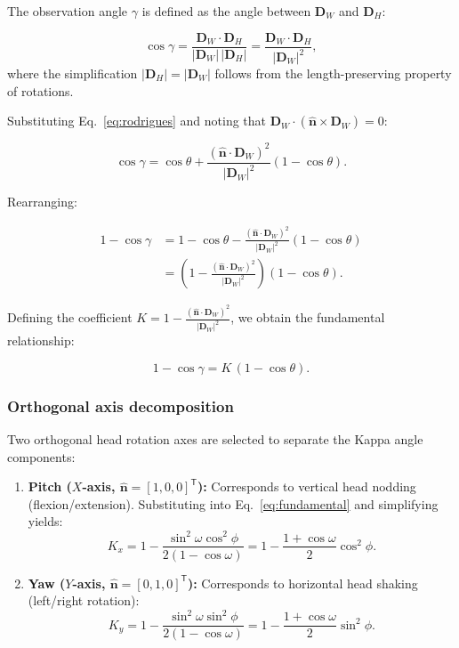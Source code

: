 \documentclass[review,numbers,sort&compress]{elsarticle}
\begin{document}
The observation angle $\gamma$ is defined as the angle between $\mathbf{D}_W$ and $\mathbf{D}_H$:

\begin{equation}
\cos\gamma = \frac{\mathbf{D}_W\cdot\mathbf{D}_H}{|\mathbf{D}_W|\,|\mathbf{D}_H|} = \frac{\mathbf{D}_W\cdot\mathbf{D}_H}{|\mathbf{D}_W|^2},
\end{equation}
where the simplification $|\mathbf{D}_H| = |\mathbf{D}_W|$ follows from the length-preserving property of rotations.

Substituting Eq.~\ref{eq:rodrigues} and noting that $\mathbf{D}_W\cdot(\hat{\mathbf{n}}\times\mathbf{D}_W) = 0$:

\begin{equation}
\cos\gamma = \cos\theta + \frac{(\hat{\mathbf{n}}\cdot\mathbf{D}_W)^2}{|\mathbf{D}_W|^2}(1-\cos\theta).
\end{equation}

Rearranging:

\begin{align}
1-\cos\gamma &= 1 - \cos\theta - \frac{(\hat{\mathbf{n}}\cdot\mathbf{D}_W)^2}{|\mathbf{D}_W|^2}(1-\cos\theta) \nonumber\\
&= \left(1 - \frac{(\hat{\mathbf{n}}\cdot\mathbf{D}_W)^2}{|\mathbf{D}_W|^2}\right)(1-\cos\theta).
\end{align}

Defining the coefficient $K = 1 - \frac{(\hat{\mathbf{n}}\cdot\mathbf{D}_W)^2}{|\mathbf{D}_W|^2}$, we obtain the fundamental relationship:

\begin{equation}
\boxed{1-\cos\gamma = K\,(1-\cos\theta)}.
\label{eq:fundamental}
\end{equation}

\subsubsection{Orthogonal axis decomposition}

Two orthogonal head rotation axes are selected to separate the Kappa angle components:

\begin{enumerate}
    \item \textbf{Pitch ($X$-axis, $\hat{\mathbf{n}}=[1,0,0]^{\mathsf{T}}$):} Corresponds to vertical head nodding (flexion/extension). Substituting into Eq.~\ref{eq:fundamental} and simplifying yields:
    \begin{equation}
    K_x = 1 - \frac{\sin^2\omega\cos^2\phi}{2(1-\cos\omega)} = 1 - \frac{1+\cos\omega}{2}\cos^2\phi.
    \label{eq:Kx}
    \end{equation}

    \item \textbf{Yaw ($Y$-axis, $\hat{\mathbf{n}}=[0,1,0]^{\mathsf{T}}$):} Corresponds to horizontal head shaking (left/right rotation):
    \begin{equation}
    K_y = 1 - \frac{\sin^2\omega\sin^2\phi}{2(1-\cos\omega)} = 1 - \frac{1+\cos\omega}{2}\sin^2\phi.
    \label{eq:Ky}
    \end{equation}
\end{enumerate}
\end{document}
